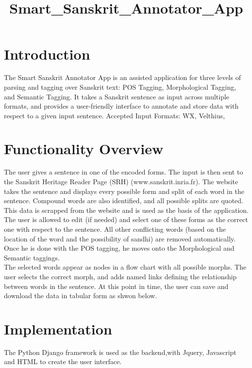 \documentclass[12pt]{article}
\title{Smart_Sanskrit\_Annotator\_App}
\begin{document}
\section{Introduction}
The Smart Sanskrit Annotator App is an assisted application for three levels of parsing and tagging over Sanskrit text: POS Tagging, Morphological Tagging, and Semantic Tagging. It takes a Sanskrit sentence as input across multiple formats, and provides a user-friendly interface to annotate and store data with respect to a given input sentence.
Accepted Input Formats: WX, Velthius,

\section{Functionality Overview}
The user gives a sentence in one of the encoded forms. The input is then sent to the Sanskrit Heritage Reader Page (SRH) (www.sanskrit.inria.fr). The website takes the sentence and displays every possible form  and split of each word in the sentence. Compound words are also identified, and all possible splits are quoted. This data is scrapped from the website and is used as the basis of the application. 
\\The user is allowed to edit (if needed) and select one of these forms as the correct one with respect to the sentence. All other conflicting words (based on the location of the word and the possibility of sandhi) are removed automatically. Once he is done with the POS tagging, he moves onto the Morphological and Semantic taggings.
\\The selected words appear as nodes in a flow chart with all possible morphs. The user selects the correct morph, and adds named links defining the relationship between words in the sentence. At this point in time, the user can save and download the data in tabular form as shwon below. 

\section{Implementation}
The Python Django framework is used as the backend,with Jquery, Javascript and HTML to create the user interface. 
\end{document}
